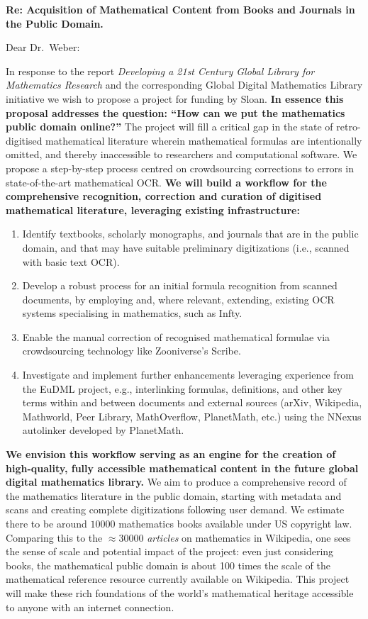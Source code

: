 \documentclass[10pt,letterpaper]{article}
\begin{document}
\thispagestyle{empty}

\noindent\textbf{Re: \quad Acquisition of Mathematical Content from Books and Journals in the Public Domain.}

\bigskip

\noindent Dear Dr.~Weber:

\bigskip

In response to the report \emph{Developing a 21st Century Global
  Library for Mathematics Research} and the corresponding Global
Digital Mathematics Library initiative we wish to propose a project
for funding by Sloan.  \textbf{In essence this proposal addresses the
  question: ``How can we put the mathematics public domain online?''}
The project will fill a critical gap in the state of retro-digitised
mathematical literature wherein mathematical formulas are
intentionally omitted, and thereby inaccessible to researchers and
computational software.  We propose a step-by-step process centred on
crowdsourcing corrections to errors in state-of-the-art mathematical
OCR.  \textbf{We will build a workflow for the comprehensive
  recognition, correction and curation of digitised mathematical
  literature, leveraging existing infrastructure:}
\begin{enumerate}
\item Identify textbooks, scholarly monographs, and journals that are
  in the public domain, and that may have suitable preliminary
  digitizations (i.e., scanned with basic text OCR).
\item Develop a robust process for an initial formula recognition from scanned 
documents, by employing and, where relevant, extending, existing OCR systems 
specialising in mathematics, such as {\sf Infty}.
\item Enable 
the manual correction of recognised mathematical formulae via crowdsourcing 
technology like Zooniverse's {\sf Scribe}.
\item Investigate and implement further enhancements leveraging
  experience from the EuDML project, e.g., interlinking formulas,
  definitions, and other key terms within and between documents and
  external sources (arXiv, Wikipedia, Mathworld, Peer Library,
  MathOverflow, PlanetMath, etc.) using the {\sf NNexus} autolinker
  developed by PlanetMath.
\end{enumerate}
\textbf{We envision this workflow serving as an engine for the
  creation of high-quality, fully accessible mathematical content in
  the future global digital mathematics library.}  We aim to produce a
comprehensive record of the mathematics literature in the public
domain, starting with metadata and scans and creating complete
digitizations following user demand.  We estimate there to be around
$10000$ mathematics books available under US copyright law.  Comparing
this to the $\approx$30000 \emph{articles} on mathematics in
Wikipedia, one sees the sense of scale and potential impact of the
project: even just considering books, the mathematical public domain
is about 100 times the scale of the mathematical reference resource
currently available on Wikipedia.  This project will make these rich
foundations of the world's mathematical heritage accessible to anyone
with an internet connection.
\end{document}
